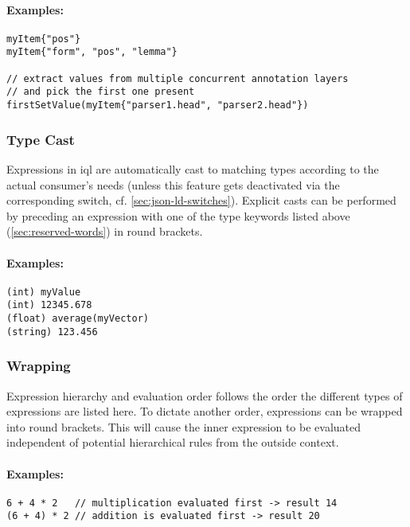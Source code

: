 \documentclass[11pt,a4paper]{article}
\begin{document}
\paragraph{Examples:}

\begin{Verbatim}[samepage=true]
myItem{"pos"}
myItem{"form", "pos", "lemma"} 

// extract values from multiple concurrent annotation layers
// and pick the first one present
firstSetValue(myItem{"parser1.head", "parser2.head"})  
\end{Verbatim}

\subsubsection{Type Cast}
\label{sec:type-cast}

Expressions in \ac{iql} are automatically cast to matching types according to the actual consumer's needs (unless this feature gets deactivated via the corresponding switch, cf. \cref{sec:json-ld-switches}). Explicit casts can be performed by preceding an expression with one of the type keywords listed above (\ref{sec:reserved-words}) in round brackets.

\paragraph{Examples:}

\begin{Verbatim}[samepage=true]
(int) myValue
(int) 12345.678
(float) average(myVector)
(string) 123.456
\end{Verbatim}

\subsubsection{Wrapping}
\label{sec:wrapping}

Expression hierarchy and evaluation order follows the order the different types of expressions are listed here. To dictate another order, expressions can be wrapped into round brackets. This will cause the inner expression to be evaluated independent of potential hierarchical rules from the outside context.

\paragraph{Examples:}

\begin{Verbatim}[samepage=true]
6 + 4 * 2   // multiplication evaluated first -> result 14
(6 + 4) * 2 // addition is evaluated first -> result 20
\end{Verbatim}
\end{document}
